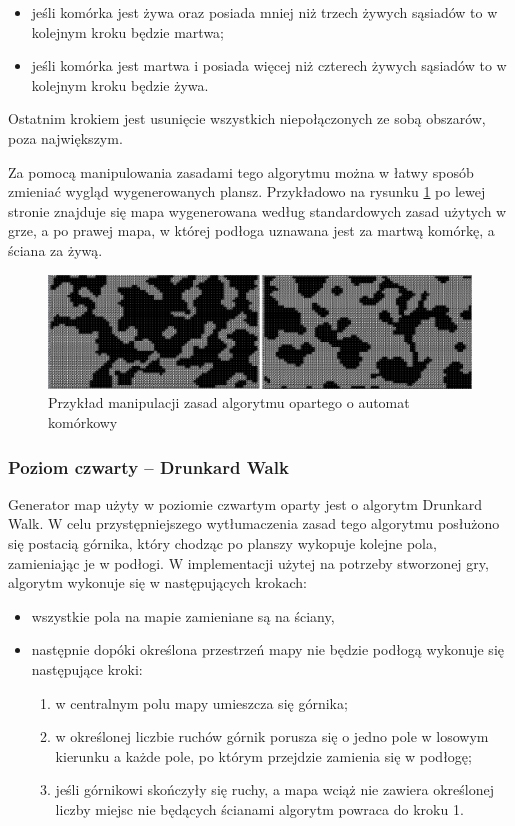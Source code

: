 \documentclass[12pt,twoside]{article}
\begin{document}
\begin{itemize}
	\item jeśli komórka jest żywa oraz posiada mniej niż trzech żywych sąsiadów to w kolejnym kroku będzie martwa;
	\item jeśli komórka jest martwa i posiada więcej niż czterech żywych sąsiadów to w kolejnym kroku będzie żywa.
\end{itemize}

Ostatnim krokiem jest usunięcie wszystkich niepołączonych ze sobą obszarów, poza największym.

Za pomocą manipulowania zasadami tego algorytmu można w łatwy sposób zmieniać wygląd wygenerowanych plansz. Przykładowo na rysunku \ref{generators:ca_diff} po lewej stronie znajduje się mapa wygenerowana według standardowych zasad użytych w grze, a po prawej mapa, w której podłoga uznawana jest za martwą komórkę, a ściana za żywą.

\FloatBarrier
\begin{figure}[ht]
	\centering
	\includegraphics[width=16cm]{images/generators/ca_diff.png}
	\caption{Przykład manipulacji zasad algorytmu opartego o automat komórkowy}
	\label{generators:ca_diff}
\end{figure}
\FloatBarrier


\subsubsection{Poziom czwarty -- Drunkard Walk}
Generator map użyty w poziomie czwartym oparty jest o algorytm Drunkard Walk. W celu przystępniejszego wytłumaczenia zasad tego algorytmu posłużono się postacią górnika, który chodząc po planszy wykopuje kolejne pola, zamieniając je w podłogi. W implementacji użytej na potrzeby stworzonej gry, algorytm wykonuje się w następujących krokach:

\begin{itemize}
	\item wszystkie pola na mapie zamieniane są na ściany,
	\item następnie dopóki określona przestrzeń mapy nie będzie podłogą wykonuje się następujące kroki:
	\begin{enumerate}
		\item w centralnym polu mapy umieszcza się górnika;
		\item w określonej liczbie ruchów górnik porusza się o jedno pole w losowym kierunku a każde pole, po którym przejdzie zamienia się w podłogę;
		\item jeśli górnikowi skończyły się ruchy, a mapa wciąż nie zawiera określonej liczby miejsc nie będących ścianami algorytm powraca do kroku 1.
	\end{enumerate}	
\end{itemize}
\end{document}
